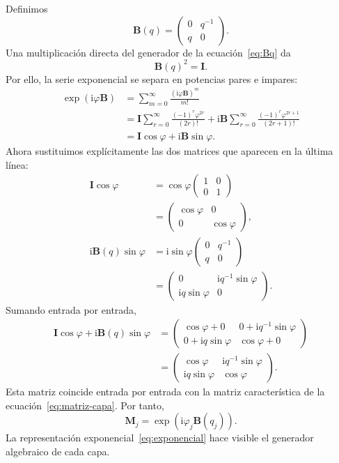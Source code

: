 \documentclass[10pt,a4paper]{article}
\newcommand{\ii}{\mathrm{i}}
\newcommand{\M}{\mathbf{M}}
\newcommand{\B}{\mathbf{B}}
\newcommand{\I}{\mathbf{I}}
\begin{document}
Definimos
\begin{equation}
\B(q)=
\begin{pmatrix}
0&q^{-1}\\
q&0
\end{pmatrix}.
\label{eq:Bq}
\end{equation}
Una multiplicaci\'on directa del generador de la ecuaci\'on~\eqref{eq:Bq} da
\begin{equation}
\B(q)^2=\I.
\label{eq:B2}
\end{equation}
Por ello, la serie exponencial se separa en potencias pares e impares:
\begin{align}
\exp\!\left(\ii\varphi\B\right)
&=\sum_{m=0}^{\infty}\frac{(\ii\varphi\B)^m}{m!}\\
&=\I\sum_{r=0}^{\infty}\frac{(-1)^r\varphi^{2r}}{(2r)!}
+\ii\B\sum_{r=0}^{\infty}\frac{(-1)^r\varphi^{2r+1}}{(2r+1)!}\\
&=\I\cos\varphi+\ii\B\sin\varphi.
\end{align}
Ahora sustituimos expl\'icitamente las dos matrices que aparecen en la \'ultima l\'inea:
\begin{align*}
\I\cos\varphi
&=\cos\varphi
\begin{pmatrix}
1&0\\0&1
\end{pmatrix}
\nonumber\\
&=
\begin{pmatrix}
\cos\varphi&0\\0&\cos\varphi
\end{pmatrix},
\\[4pt]
\ii\B(q)\sin\varphi
&=\ii\sin\varphi
\begin{pmatrix}
0&q^{-1}\\q&0
\end{pmatrix}
\nonumber\\
&=
\begin{pmatrix}
0&\ii q^{-1}\sin\varphi\\
\ii q\sin\varphi&0
\end{pmatrix}.
\end{align*}
Sumando entrada por entrada,
\begin{align*}
\I\cos\varphi+\ii\B(q)\sin\varphi
&=
\begin{pmatrix}
\cos\varphi+0&0+\ii q^{-1}\sin\varphi\\
0+\ii q\sin\varphi&\cos\varphi+0
\end{pmatrix}
\\[3pt]
&=
\begin{pmatrix}
\cos\varphi&\ii q^{-1}\sin\varphi\\
\ii q\sin\varphi&\cos\varphi
\end{pmatrix}.
\end{align*}
Esta matriz coincide entrada por entrada con la matriz caracter\'istica de la ecuaci\'on~\eqref{eq:matriz-capa}. Por tanto,
\begin{equation}
\boxed{\M_j=\exp\!\left(\ii\varphi_j\B(q_j)\right).}
\label{eq:exponencial}
\end{equation}
La representaci\'on exponencial~\eqref{eq:exponencial} hace visible el generador algebraico de cada capa.
\end{document}

